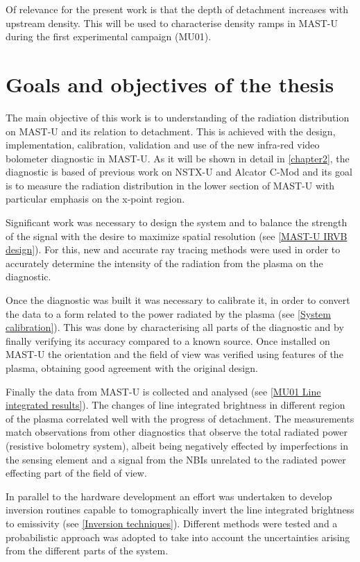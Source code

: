 Of relevance for the present work is that the depth of detachment increases with upstream density. This will be used to characterise density ramps in MAST-U during the first experimental campaign (MU01).

\section{Goals and objectives of the thesis}

The main objective of this work is to understanding of the radiation distribution on MAST-U and its relation to detachment. This is achieved with the design, implementation, calibration, validation and use of  the new infra-red video bolometer diagnostic in MAST-U. As it will be shown in detail in \autoref{chapter2}, the diagnostic is based of previous work on NSTX-U\cite{VanEden2016} and Alcator C-Mod\cite{Reinke2018a} and its goal is to measure the radiation distribution in the lower section of MAST-U with particular emphasis on the x-point region.

Significant work was necessary to design the system and to balance the strength of the signal with the desire to maximize spatial resolution (see \autoref{MAST-U IRVB design}). For this, new and accurate ray tracing methods were used in order to accurately determine the intensity of the radiation from the plasma on the diagnostic.

Once the diagnostic was built it was necessary to calibrate it, in order to convert the data to a form related to the power radiated by the plasma (see \autoref{System calibration}). This was done by characterising all parts of the diagnostic and by finally verifying its accuracy compared to a known source. Once installed on MAST-U the orientation and the field of view was verified using features of the plasma, obtaining good agreement with the original design.

Finally the data from MAST-U is collected and analysed (see \autoref{MU01 Line integrated results}). The changes of line integrated brightness in different region of the plasma correlated well with the progress of detachment. The measurements match observations from other diagnostics that observe the total radiated power (resistive bolometry system), albeit being negatively effected by imperfections in the sensing element and a signal from the NBIs unrelated to the radiated power effecting part of the field of view.

In parallel to the hardware development an effort was undertaken to develop inversion routines capable to tomographically invert the line integrated brightness to emissivity (see \autoref{Inversion techniques}). Different methods were tested and a probabilistic approach was adopted to take into account the uncertainties arising from the different parts of the system.

